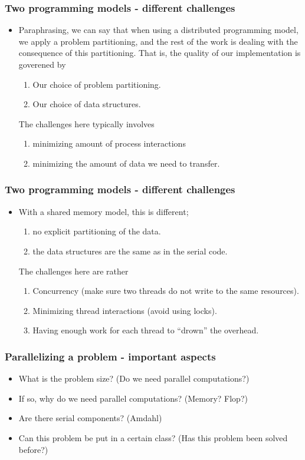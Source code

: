\documentclass{beamer}
\begin{document}
\begin{frame}\frametitle{Two programming models - different challenges}
  \begin{itemize}
    \item Paraphrasing, we can say that when using a distributed programming
          model, we apply a problem partitioning, and the rest of the work is 
          dealing with the consequence of this partitioning. That is, the
          quality of our implementation is goverened by
          \begin{enumerate}
            \item Our choice of problem partitioning.
            \item Our choice of data structures.
          \end{enumerate}
          The challenges here typically involves 
          \begin{enumerate}
            \item minimizing amount of process interactions 
            \item minimizing the amount of data we need to transfer.
          \end{enumerate}
  \end{itemize}
\end{frame}
\begin{frame}\frametitle{Two programming models - different challenges}
  \begin{itemize}
    \item With a shared memory model, this is different;
          \begin{enumerate}
            \item no explicit partitioning of the data.
            \item the data structures are the same as in the serial code.
          \end{enumerate}
          The challenges here are rather
          \begin{enumerate}
            \item Concurrency (make sure two threads do not write to the same resources).
            \item Minimizing thread interactions (avoid using locks).
            \item Having enough work for each thread to ``drown'' the overhead.
          \end{enumerate}
  \end{itemize}
\end{frame}
\begin{frame}\frametitle{Parallelizing a problem - important aspects}
  \begin{itemize}
    \item What is the problem size? (Do we need parallel computations?)
    \item If so, why do we need parallel computations? (Memory? Flop?)
    \item Are there serial components? (Amdahl)
    \item Can this problem be put in a certain class? (Has this problem been solved before?)
  \end{itemize}
\end{frame}
\end{document}
